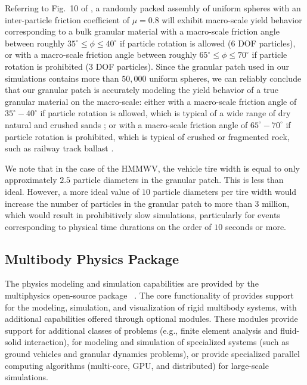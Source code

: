 \documentclass[12pt,twocolumn]{article}
\newcommand{\CHRONO}{{\sffamily{{Chrono}}}}
\begin{document}
Referring to Fig.~10 of \cite{fleischmannetalGEGE2014}, a randomly packed assembly of uniform spheres with an inter-particle friction coefficient of $\mu = 0.8$ will exhibit macro-scale yield behavior corresponding to a bulk granular material with a macro-scale friction angle between roughly $35^\circ \leq \phi \leq 40^\circ$ if particle rotation is allowed (6 DOF particles), or with a macro-scale friction angle between roughly $65^\circ \leq \phi \leq 70^\circ$ if particle rotation is prohibited (3 DOF particles).
%
Since the granular patch used in our simulations contains more than $50,000$ uniform spheres, we can reliably conclude that our granular patch is accurately modeling the yield behavior of a true granular material on the macro-scale: either with a macro-scale friction angle of $35^\circ-40^\circ$ if particle rotation is allowed, which is typical of a wide range of dry natural and crushed sands \cite{Cho&Dodds&Santamarina2006}; or with a macro-scale friction angle of $65^\circ-70^\circ$ if particle rotation is prohibited, which is typical of crushed or fragmented rock, such as railway track ballast \cite{Indraratnaetal1998}.

We note that in the case of the HMMWV, the vehicle tire width is equal to only approximately $2.5$ particle diameters in the granular patch.  This is less than ideal.  However, a more ideal value of $10$ particle diameters per tire width would increase the number of particles in the granular patch to more than $3$ million, which would result in prohibitively slow simulations, particularly for events corresponding to physical time durations on the order of $10$ seconds or more.


\subsection{{\CHRONO} Multibody Physics Package}\label{ss:Chrono}

The physics modeling and simulation capabilities are provided by the multiphysics open-source package {\CHRONO}~\cite{Chrono2016}. The core functionality of {\CHRONO} provides support for the modeling, simulation, and visualization of rigid multibody systems, with additional capabilities offered through optional modules. These modules provide support for additional classes of problems (e.g., finite element analysis and fluid-solid interaction), for modeling and simulation of specialized systems (such as ground vehicles and granular dynamics problems), or provide specialized parallel computing algorithms (multi-core, GPU, and distributed) for large-scale simulations.
\end{document}
